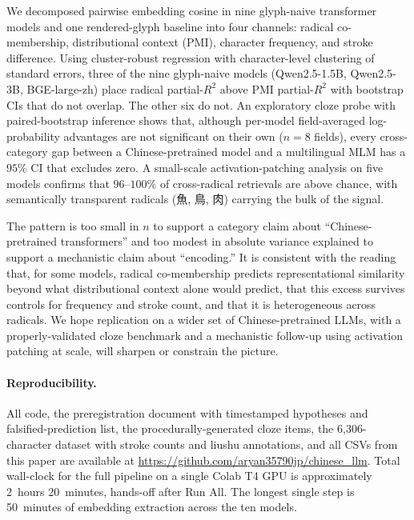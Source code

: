 \documentclass[11pt,a4paper,twocolumn]{article}
\begin{document}
We decomposed pairwise embedding cosine in nine glyph-naive transformer
models and one rendered-glyph baseline into four channels: radical
co-membership, distributional context (PMI), character frequency, and
stroke difference. Using cluster-robust regression with character-level
clustering of standard errors, three of the nine glyph-naive models
(Qwen2.5-1.5B, Qwen2.5-3B, BGE-large-zh) place radical partial-$R^2$
above PMI partial-$R^2$ with bootstrap CIs that do not overlap. The
other six do not. An exploratory cloze probe with paired-bootstrap
inference shows that, although per-model field-averaged
log-probability advantages are not significant on their own ($n = 8$
fields), every cross-category gap between a Chinese-pretrained model
and a multilingual MLM has a $95\%$ CI that excludes zero. A
small-scale activation-patching analysis on five models confirms that
$96\text{--}100\%$ of cross-radical retrievals are above chance, with
semantically transparent radicals (魚, 鳥, 肉) carrying the bulk of
the signal.

The pattern is too small in $n$ to support a category claim about
``Chinese-pretrained transformers'' and too modest in absolute
variance explained to support a mechanistic claim about ``encoding.''
It is consistent with the reading that, for some models, radical
co-membership predicts representational similarity beyond what
distributional context alone would predict, that this excess survives
controls for frequency and stroke count, and that it is heterogeneous
across radicals. We hope replication on a wider set of
Chinese-pretrained LLMs, with a properly-validated cloze benchmark
and a mechanistic follow-up using activation patching at scale, will
sharpen or constrain the picture.

\paragraph{Reproducibility.}
All code, the preregistration document with timestamped hypotheses
and falsified-prediction list, the procedurally-generated cloze items,
the 6{,}306-character dataset with stroke counts and liushu
annotations, and all CSVs from this paper are available at
\url{https://github.com/aryan35790jp/chinese_llm}. Total wall-clock
for the full pipeline on a single Colab T4 GPU is approximately
2~hours 20~minutes, hands-off after Run All. The longest single step
is 50~minutes of embedding extraction across the ten models.
\end{document}
